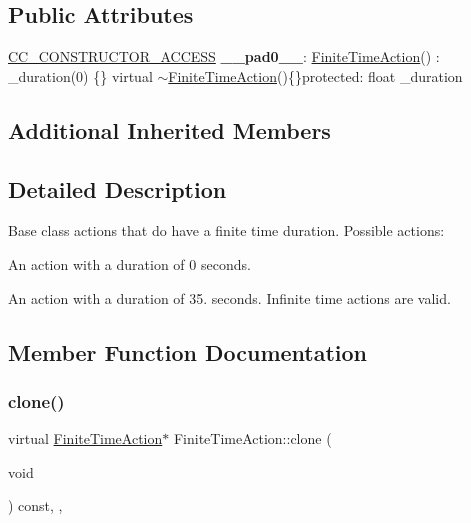 \subsection*{Public Attributes}
\begin{DoxyCompactItemize}
\item 
\mbox{\label{classFiniteTimeAction_aab6e6d20d9fc5e215fe637d91ae0d338}} 
\hyperlink{_2cocos2d_2cocos_2base_2ccConfig_8h_a25ef1314f97c35a2ed3d029b0ead6da0}{C\+C\+\_\+\+C\+O\+N\+S\+T\+R\+U\+C\+T\+O\+R\+\_\+\+A\+C\+C\+E\+SS} {\bfseries \+\_\+\+\_\+pad0\+\_\+\+\_\+}\+: \hyperlink{classFiniteTimeAction}{Finite\+Time\+Action}() \+: \+\_\+duration(0) \{\} virtual $\sim$\hyperlink{classFiniteTimeAction}{Finite\+Time\+Action}()\{\}protected\+: float \+\_\+duration
\end{DoxyCompactItemize}
\subsection*{Additional Inherited Members}


\subsection{Detailed Description}
Base class actions that do have a finite time duration. Possible actions\+: 


\begin{DoxyItemize}
\item An action with a duration of 0 seconds.
\item An action with a duration of 35. seconds. Infinite time actions are valid. 
\end{DoxyItemize}

\subsection{Member Function Documentation}
\mbox{\label{classFiniteTimeAction_a44813fca4fdf22f367a4657147dd150b}} 
\subsubsection{\texorpdfstring{clone()}{clone()}\hspace{0.1cm}{\footnotesize\ttfamily [1/2]}}
{\footnotesize\ttfamily virtual \hyperlink{classFiniteTimeAction}{Finite\+Time\+Action}$\ast$ Finite\+Time\+Action\+::clone (\begin{DoxyParamCaption}\item[{void}]{ }\end{DoxyParamCaption}) const\hspace{0.3cm}{\ttfamily [inline]}, {\ttfamily [override]}, {\ttfamily [virtual]}}

